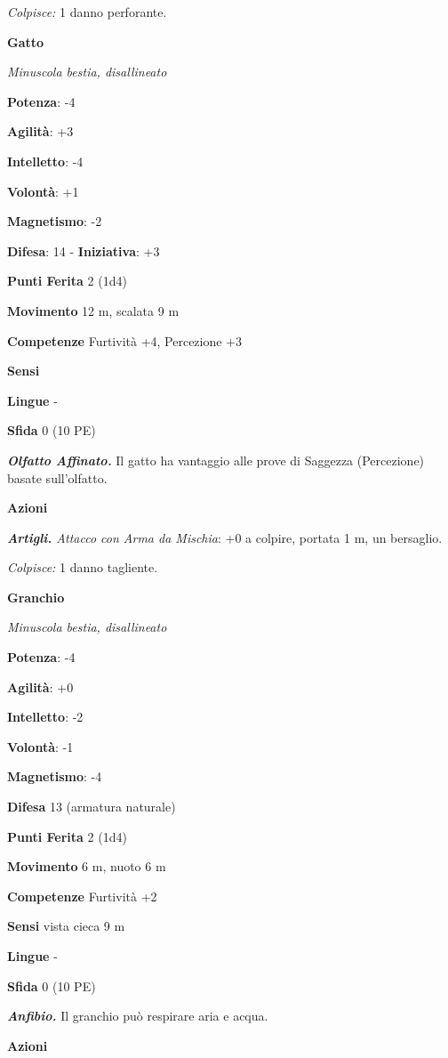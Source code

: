 \begin{multicols}{2}
\emph{Colpisce:} 1 danno perforante.

\textbf{Gatto}

\emph{Minuscola bestia, disallineato}

\textbf{Potenza}: -4

\textbf{Agilità}: +3

\textbf{Intelletto}: -4

\textbf{Volontà}: +1

\textbf{Magnetismo}: -2

\textbf{Difesa}: 14 - \textbf{Iniziativa}: +3

\textbf{Punti Ferita} 2 (1d4)

\textbf{Movimento} 12 m, scalata 9 m

\textbf{Competenze} Furtività +4, Percezione +3

\textbf{Sensi} 

\textbf{Lingue} -

\textbf{Sfida} 0 (10 PE)\smallskip

\emph{\textbf{Olfatto Affinato.}} Il gatto ha vantaggio alle prove di
Saggezza (Percezione) basate sull'olfatto.

\smallskip\textbf{Azioni}

\emph{\textbf{Artigli.} Attacco con Arma da Mischia}: +0 a colpire,
portata 1 m, un bersaglio.

\emph{Colpisce:} 1 danno tagliente.

\textbf{Granchio}

\emph{Minuscola bestia, disallineato}

\textbf{Potenza}: -4

\textbf{Agilità}: +0

\textbf{Intelletto}: -2

\textbf{Volontà}: -1

\textbf{Magnetismo}: -4

\textbf{Difesa} 13 (armatura naturale)

\textbf{Punti Ferita} 2 (1d4)

\textbf{Movimento} 6 m, nuoto 6 m

\textbf{Competenze} Furtività +2

\textbf{Sensi} vista cieca 9 m

\textbf{Lingue} -

\textbf{Sfida} 0 (10 PE)\smallskip

\emph{\textbf{Anfibio.}} Il granchio può respirare aria e acqua.

\smallskip\textbf{Azioni}


\end{multicols}

